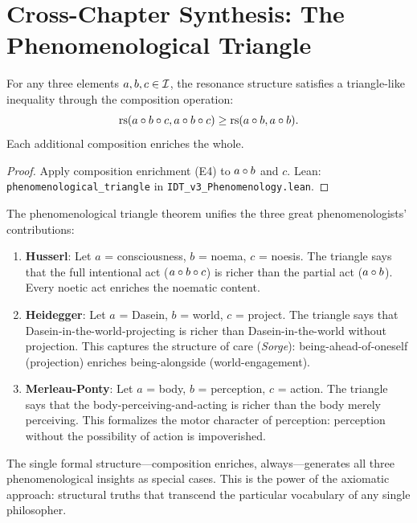 \section{Cross-Chapter Synthesis: The Phenomenological Triangle}

\begin{theorem}
\label{thm:phenom-triangle}
For any three elements $a, b, c \in \mathcal{I}$, the resonance structure satisfies
a triangle-like inequality through the composition operation:
\[
\mathrm{rs}(a \circ b \circ c, a \circ b \circ c) \geq
\mathrm{rs}(a \circ b, a \circ b).
\]
Each additional composition enriches the whole.
\end{theorem}

\begin{proof}
Apply composition enrichment (E4) to $a \circ b$ and $c$.
Lean: \texttt{phenomenological\_triangle} in \texttt{IDT\_v3\_Phenomenology.lean}.
\end{proof}

\begin{interpretation}
\label{interp:phenom-unity}
The phenomenological triangle theorem unifies the three great
phenomenologists' contributions:

\begin{enumerate}
\item \textbf{Husserl}: Let $a$ = consciousness, $b$ = noema, $c$ = noesis.
The triangle says that the full intentional act ($a \circ b \circ c$)
is richer than the partial act ($a \circ b$).  Every noetic act enriches
the noematic content.

\item \textbf{Heidegger}: Let $a$ = Dasein, $b$ = world, $c$ = project.
The triangle says that Dasein-in-the-world-projecting is richer than
Dasein-in-the-world without projection.  This captures the structure of
care (\textit{Sorge}): being-ahead-of-oneself (projection) enriches
being-alongside (world-engagement).

\item \textbf{Merleau-Ponty}: Let $a$ = body, $b$ = perception, $c$ = action.
The triangle says that the body-perceiving-and-acting is richer than the
body merely perceiving.  This formalizes the motor character of perception:
perception without the possibility of action is impoverished.
\end{enumerate}

The single formal structure---composition enriches, always---generates all
three phenomenological insights as special cases.  This is the power of
the axiomatic approach: structural truths that transcend the particular
vocabulary of any single philosopher.
\end{interpretation}


